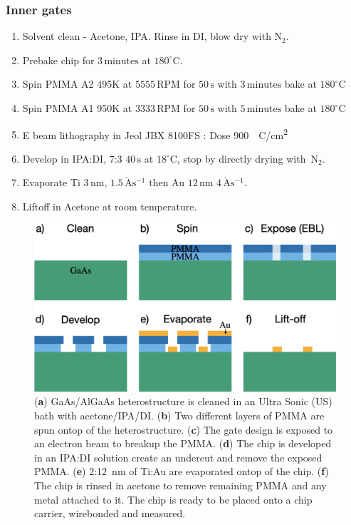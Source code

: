 \subsubsection{Inner gates}

\begin{enumerate}
\item Solvent clean - Acetone, IPA. Rinse in DI, blow dry with $\mathrm{N_2}$.
\item Prebake chip for $3\,\mathrm{minutes}$ at $180^\circ$C.
\item Spin PMMA A2 495K at $5555\,\mathrm{RPM}$ for $50\,\mathrm{s}$  with $3\,\mathrm{minutes}$ bake at $180^\circ$C
\item Spin PMMA A1 950K at $3333\,\mathrm{RPM}$ for $50\,\mathrm{s}$  with $5\,\mathrm{minutes}$ bake at $180^\circ$C
\item E beam lithography in Jeol JBX 8100FS : Dose \qty{900}{\mu C/cm^2}
\item Develop in IPA:DI, 7:3 $40\,\mathrm{s}$ at $18^\circ$C, stop by directly drying with $\,\mathrm{N_2}$.
\item Evaporate Ti $3\,\mathrm{nm}$, $1.5\,\mathrm{\dot{A}s^{-1}}$ then Au $12\,\mathrm{nm}$ $4\,\mathrm{\dot{A}s^{-1}}$.
\item Liftoff in Acetone at room temperature.
\end{enumerate}



\begin{figure}[!bht]
  \begin{center}
    \includegraphics[width=1.0\textwidth]{figures/appendix/crop_FiguresMaster.020.png}
    \caption[Step by step illustration for fabricating metal gates]{\label{fig:appx/gate_fab} 
    (\textbf{a}) GaAs/AlGaAs heterostructure is cleaned in an Ultra Sonic (US) bath with acetone/IPA/DI. 
    (\textbf{b}) Two different layers of PMMA are spun ontop of the heterostructure.
    (\textbf{c}) The gate design is exposed to an electron beam to breakup the PMMA.
    (\textbf{d}) The chip is developed in an IPA:DI solution create an undercut and remove the exposed PMMA.
    (\textbf{e}) 2:\qty{12}{nm} of Ti:Au are evaporated ontop of the chip.
    (\textbf{f}) The chip is rinsed in acetone to remove remaining PMMA and any metal attached to it. The chip is ready to be placed onto a chip carrier, wirebonded and measured.}
  \end{center}
\end{figure}



